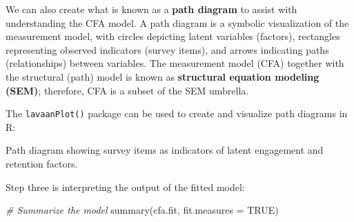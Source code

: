\documentclass[
]{book}
\newenvironment{Shaded}{\begin{snugshade}}{\end{snugshade}}
\newcommand{\AttributeTok}[1]{\textcolor[rgb]{0.77,0.63,0.00}{#1}}
\newcommand{\CommentTok}[1]{\textcolor[rgb]{0.56,0.35,0.01}{\textit{#1}}}
\newcommand{\ConstantTok}[1]{\textcolor[rgb]{0.00,0.00,0.00}{#1}}
\newcommand{\FunctionTok}[1]{\textcolor[rgb]{0.00,0.00,0.00}{#1}}
\newcommand{\NormalTok}[1]{#1}
\begin{document}
We can also create what is known as a \textbf{path diagram} to assist with understanding the CFA model. A path diagram is a symbolic visualization of the measurement model, with circles depicting latent variables (factors), rectangles representing observed indicators (survey items), and arrows indicating paths (relationships) between variables. The measurement model (CFA) together with the structural (path) model is known as \textbf{structural equation modeling (SEM)}; therefore, CFA is a subset of the SEM umbrella.

The \texttt{lavaanPlot()} package can be used to create and visualize path diagrams in R:

\label{fig:path-diagram}Path diagram showing survey items as indicators of latent engagement and retention factors.

Step three is interpreting the output of the fitted model:

\begin{Shaded}
\begin{Highlighting}[]
\CommentTok{\# Summarize the model}
\FunctionTok{summary}\NormalTok{(cfa.fit, }\AttributeTok{fit.measures =} \ConstantTok{TRUE}\NormalTok{)}
\end{Highlighting}
\end{Shaded}
\end{document}
